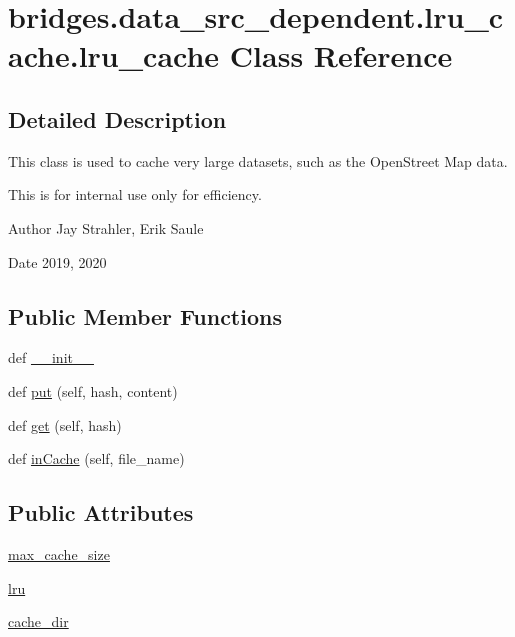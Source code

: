 \hypertarget{classbridges_1_1data__src__dependent_1_1lru__cache_1_1lru__cache}{}\section{bridges.\+data\+\_\+src\+\_\+dependent.\+lru\+\_\+cache.\+lru\+\_\+cache Class Reference}
\label{classbridges_1_1data__src__dependent_1_1lru__cache_1_1lru__cache}


\subsection{Detailed Description}
This class is used to cache very large datasets, such as the Open\+Street Map data. 

This is for internal use only for efficiency.

\begin{DoxyAuthor}{Author}
Jay Strahler, Erik Saule 
\end{DoxyAuthor}
\begin{DoxyDate}{Date}
2019, 2020 
\end{DoxyDate}
\subsection*{Public Member Functions}
\begin{DoxyCompactItemize}
\item 
def \hyperlink{classbridges_1_1data__src__dependent_1_1lru__cache_1_1lru__cache_a66d09fd9beb3e82c94960960456fc6f7}{\+\_\+\+\_\+init\+\_\+\+\_\+}
\item 
def \hyperlink{classbridges_1_1data__src__dependent_1_1lru__cache_1_1lru__cache_a98b97dd34aeaec0856bbc560cbac2866}{put} (self, hash, content)
\item 
def \hyperlink{classbridges_1_1data__src__dependent_1_1lru__cache_1_1lru__cache_a808ebb43936c26cae242752509e3e772}{get} (self, hash)
\item 
def \hyperlink{classbridges_1_1data__src__dependent_1_1lru__cache_1_1lru__cache_abfd53102b85993476f3dc75416811761}{in\+Cache} (self, file\+\_\+name)
\end{DoxyCompactItemize}
\subsection*{Public Attributes}
\begin{DoxyCompactItemize}
\item 
\hyperlink{classbridges_1_1data__src__dependent_1_1lru__cache_1_1lru__cache_a87a170ed62886de32e1bbf0d9ac05cfd}{max\+\_\+cache\+\_\+size}
\item 
\hyperlink{classbridges_1_1data__src__dependent_1_1lru__cache_1_1lru__cache_a2568c6b5de855a1ad90f876276b8cf49}{lru}
\item 
\hyperlink{classbridges_1_1data__src__dependent_1_1lru__cache_1_1lru__cache_af65782fe4cbb48b025c985d43b1bd7f2}{cache\+\_\+dir}
\end{DoxyCompactItemize}


